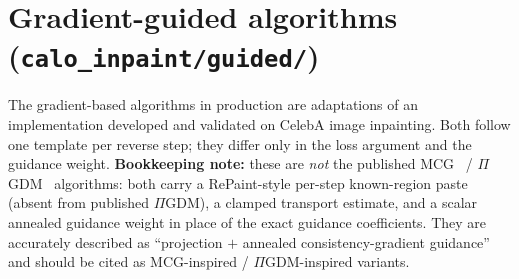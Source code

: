 \documentclass[11pt]{article}
\begin{document}
\section{Gradient-guided algorithms (\texttt{calo\_inpaint/guided/})}
\label{sec:guided}

The gradient-based algorithms in production are adaptations of an
implementation developed and validated on CelebA image inpainting.
Both follow one template per reverse step; they differ only in the loss
argument and the guidance weight.  \textbf{Bookkeeping note:} these are
\emph{not} the published MCG~\cite{chung2022mcg} /
$\Pi$GDM~\cite{song2023pigdm} algorithms: both carry a RePaint-style
per-step known-region paste (absent from published $\Pi$GDM), a clamped
transport estimate, and a scalar annealed guidance weight in place of the
exact guidance coefficients.  They are accurately described as
``projection $+$ annealed consistency-gradient guidance'' and should be
cited as MCG-inspired / $\Pi$GDM-inspired variants.
\end{document}
